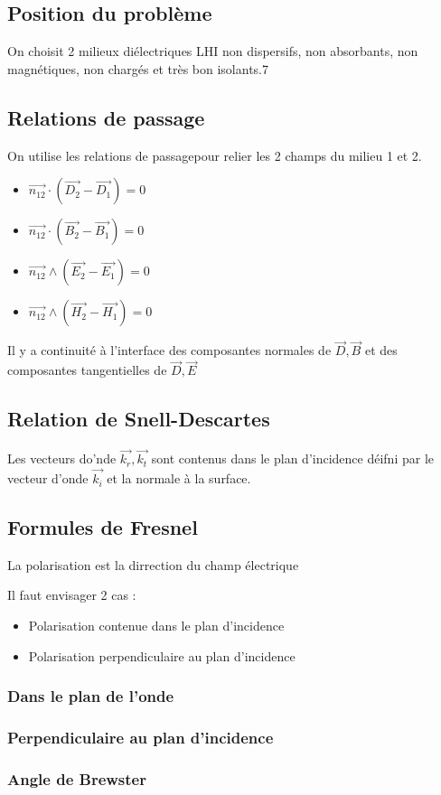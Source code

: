 \documentclass[french]{yLectureNote}
\renewcommand{\vec}{\overrightarrow}
\begin{document}
\subsection{Position du problème}
On choisit 2 milieux diélectriques LHI non dispersifs, non absorbants, non magnétiques, non chargés et très bon isolants.7
\subsection{Relations de passage}
On utilise les relations de passagepour relier les 2  champs du milieu 1 et 2.
\begin{itemize}
    \item $\vec{n_{12}}\cdot (\vec{D_2}-\vec{D_1})=0$
    \item $\vec{n_{12}}\cdot (\vec{B_2}-\vec{B_1})=0$
     \item $\vec{n_{12}}\wedge (\vec{E_2}-\vec{E_1})=0$
    \item $\vec{n_{12}}\wedge (\vec{H_2}-\vec{H_1})=0$
\end{itemize}
Il y a continuité à l'interface des composantes normales de $\vec{D},\vec{B}$ et des composantes tangentielles de $\vec{D}, \vec{E}$
\subsection{Relation de Snell-Descartes}
Les vecteurs do'nde $\vec{k_r}, \vec{k_t}$ sont contenus dans le plan d'incidence déifni par le vecteur d'onde $\vec{k_i}$ et la normale à la surface.
\subsection{Formules de Fresnel}
La polarisation est la dirrection du champ électrique

Il faut envisager 2  cas :
\begin{itemize}
    \item Polarisation contenue dans le plan d'incidence
    \item Polarisation perpendiculaire au plan d'incidence
\end{itemize}
\subsubsection{Dans le plan de l'onde}
\subsubsection{Perpendiculaire au plan d'incidence}
\subsubsection{Angle de Brewster}
\end{document}
